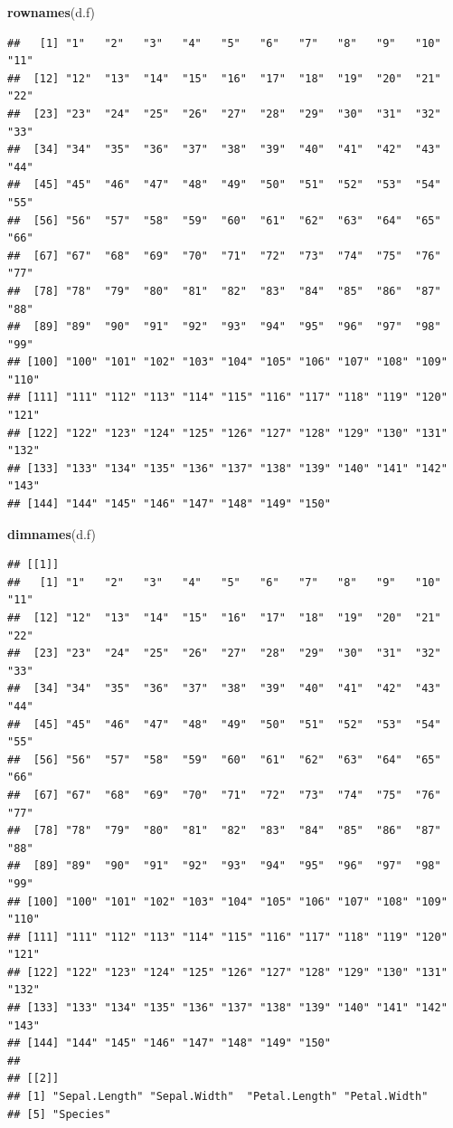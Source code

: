 \documentclass[]{book}
\newenvironment{Shaded}{\begin{snugshade}}{\end{snugshade}}
\newcommand{\KeywordTok}[1]{\textcolor[rgb]{0.13,0.29,0.53}{\textbf{#1}}}
\newcommand{\NormalTok}[1]{#1}
\theoremstyle{definition}
\theoremstyle{definition}
\theoremstyle{definition}
\theoremstyle{remark}
\begin{document}
\begin{Shaded}
\begin{Highlighting}[]
\KeywordTok{rownames}\NormalTok{(d.f)}
\end{Highlighting}
\end{Shaded}

\begin{verbatim}
##   [1] "1"   "2"   "3"   "4"   "5"   "6"   "7"   "8"   "9"   "10"  "11" 
##  [12] "12"  "13"  "14"  "15"  "16"  "17"  "18"  "19"  "20"  "21"  "22" 
##  [23] "23"  "24"  "25"  "26"  "27"  "28"  "29"  "30"  "31"  "32"  "33" 
##  [34] "34"  "35"  "36"  "37"  "38"  "39"  "40"  "41"  "42"  "43"  "44" 
##  [45] "45"  "46"  "47"  "48"  "49"  "50"  "51"  "52"  "53"  "54"  "55" 
##  [56] "56"  "57"  "58"  "59"  "60"  "61"  "62"  "63"  "64"  "65"  "66" 
##  [67] "67"  "68"  "69"  "70"  "71"  "72"  "73"  "74"  "75"  "76"  "77" 
##  [78] "78"  "79"  "80"  "81"  "82"  "83"  "84"  "85"  "86"  "87"  "88" 
##  [89] "89"  "90"  "91"  "92"  "93"  "94"  "95"  "96"  "97"  "98"  "99" 
## [100] "100" "101" "102" "103" "104" "105" "106" "107" "108" "109" "110"
## [111] "111" "112" "113" "114" "115" "116" "117" "118" "119" "120" "121"
## [122] "122" "123" "124" "125" "126" "127" "128" "129" "130" "131" "132"
## [133] "133" "134" "135" "136" "137" "138" "139" "140" "141" "142" "143"
## [144] "144" "145" "146" "147" "148" "149" "150"
\end{verbatim}

\begin{Shaded}
\begin{Highlighting}[]
\KeywordTok{dimnames}\NormalTok{(d.f)}
\end{Highlighting}
\end{Shaded}

\begin{verbatim}
## [[1]]
##   [1] "1"   "2"   "3"   "4"   "5"   "6"   "7"   "8"   "9"   "10"  "11" 
##  [12] "12"  "13"  "14"  "15"  "16"  "17"  "18"  "19"  "20"  "21"  "22" 
##  [23] "23"  "24"  "25"  "26"  "27"  "28"  "29"  "30"  "31"  "32"  "33" 
##  [34] "34"  "35"  "36"  "37"  "38"  "39"  "40"  "41"  "42"  "43"  "44" 
##  [45] "45"  "46"  "47"  "48"  "49"  "50"  "51"  "52"  "53"  "54"  "55" 
##  [56] "56"  "57"  "58"  "59"  "60"  "61"  "62"  "63"  "64"  "65"  "66" 
##  [67] "67"  "68"  "69"  "70"  "71"  "72"  "73"  "74"  "75"  "76"  "77" 
##  [78] "78"  "79"  "80"  "81"  "82"  "83"  "84"  "85"  "86"  "87"  "88" 
##  [89] "89"  "90"  "91"  "92"  "93"  "94"  "95"  "96"  "97"  "98"  "99" 
## [100] "100" "101" "102" "103" "104" "105" "106" "107" "108" "109" "110"
## [111] "111" "112" "113" "114" "115" "116" "117" "118" "119" "120" "121"
## [122] "122" "123" "124" "125" "126" "127" "128" "129" "130" "131" "132"
## [133] "133" "134" "135" "136" "137" "138" "139" "140" "141" "142" "143"
## [144] "144" "145" "146" "147" "148" "149" "150"
## 
## [[2]]
## [1] "Sepal.Length" "Sepal.Width"  "Petal.Length" "Petal.Width" 
## [5] "Species"
\end{verbatim}
\end{document}
